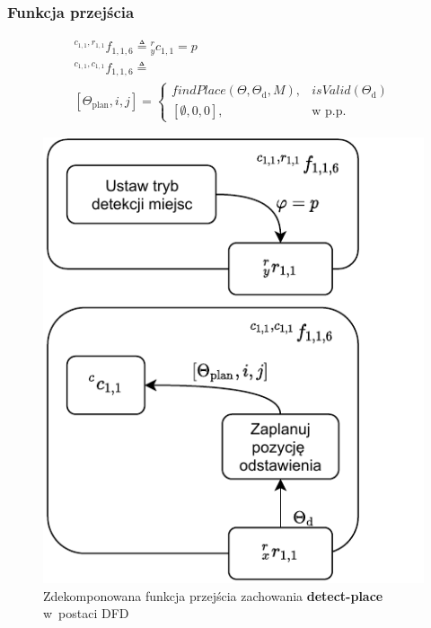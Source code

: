 \subsubsection{Funkcja przejścia}
\begin{equation}
    \begin{gathered}
        {}^{c_{1,1}, r_{1,1}}f_{1,1,6} \triangleq {}^{r}_{y}c_{1,1} = p\\
        {}^{c_{1,1}, c_{1,1}}f_{1,1,6} \triangleq \\ [\Theta_{\mathrm{plan}}, i, j] =
            \begin{cases}
			    findPlace(\Theta, \Theta_{\mathrm{d}}, M), & isValid(\Theta_{\mathrm{d}})\\
                [\emptyset, 0, 0], & \text{w p.p.}
		    \end{cases}
    \end{gathered}
\end{equation}

\begin{figure}[H]
    \centering
    \includegraphics[width=\columnwidth]{figures/ISR-cs-fp-detect-place.pdf}
    \caption{Zdekomponowana funkcja przejścia zachowania \textbf{detect-place} w~postaci DFD}
    \label{fig:cs-fp-detect-place}
\end{figure}

